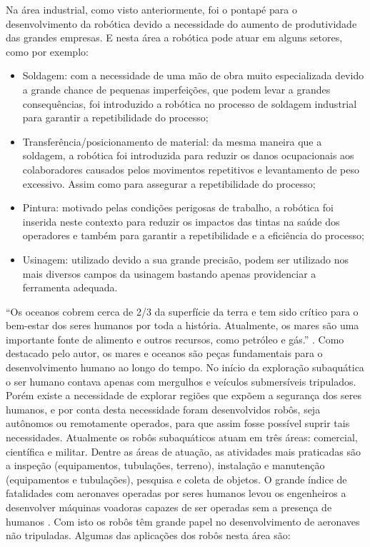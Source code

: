 Na área industrial, como visto anteriormente, foi o pontapé para o desenvolvimento da robótica devido a necessidade do aumento de produtividade das grandes empresas. E nesta área a robótica pode atuar em alguns setores, como por exemplo:

\begin{itemize}
	\item Soldagem: com a necessidade de uma mão de obra muito especializada devido a grande chance de pequenas imperfeições, que podem levar a grandes consequências, foi introduzido a robótica no processo de soldagem industrial para garantir a repetibilidade do processo;
	
	\item Transferência/posicionamento de material: da mesma maneira que a soldagem, a robótica foi introduzida para reduzir os danos ocupacionais aos colaboradores causados pelos movimentos repetitivos e levantamento de peso excessivo. Assim como para assegurar a repetibilidade do processo;
	
	\item Pintura: motivado pelas condições perigosas de trabalho, a robótica foi inserida neste contexto para reduzir os impactos das tintas na saúde dos operadores e também para garantir a repetibilidade e a eficiência do processo;
	
	\item Usinagem: utilizado devido a sua grande precisão, podem ser utilizado nos mais diversos campos da usinagem bastando apenas providenciar a ferramenta adequada.
\end{itemize}

“Os oceanos cobrem cerca de 2/3 da superfície da terra e tem sido crítico para o bem-estar dos seres humanos por toda a história. Atualmente, os mares são uma importante fonte de alimento e outros recursos, como petróleo e gás.” \cite{siciliano2016}. Como destacado pelo autor, os mares e oceanos são peças fundamentais para o desenvolvimento humano ao longo do tempo. No início da exploração subaquática o ser humano contava apenas com mergulhos e veículos submersíveis tripulados. Porém existe a necessidade de explorar regiões que expõem a segurança dos seres humanos, e por conta desta necessidade foram desenvolvidos robôs, seja autônomos ou remotamente operados,  para que assim fosse possível suprir tais necessidades. Atualmente os robôs subaquáticos atuam em três áreas: comercial, científica e militar. Dentre as áreas de atuação, as atividades mais praticadas são a inspeção (equipamentos, tubulações, terreno), instalação e manutenção (equipamentos e tubulações), pesquisa e coleta de objetos.
O grande índice de fatalidades com aeronaves operadas por seres humanos levou os engenheiros a desenvolver máquinas voadoras capazes de ser operadas sem a presença de humanos \cite{siciliano2016}. Com isto os robôs têm grande papel no desenvolvimento de aeronaves não tripuladas. Algumas das aplicações dos robôs nesta área são:

